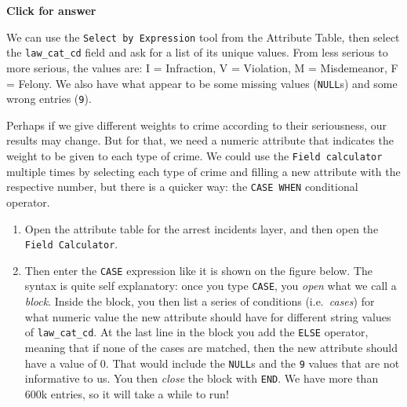 \documentclass[
  letterpaper,
  DIV=11,
  numbers=noendperiod]{scrreprt}
\begin{document}
\begin{tcolorbox}[enhanced jigsaw, toprule=.15mm, breakable, left=2mm, colframe=quarto-callout-important-color-frame, colback=white, arc=.35mm, leftrule=.75mm, opacityback=0, rightrule=.15mm, bottomrule=.15mm]

\vspace{-3mm}\textbf{Click for answer}\vspace{3mm}

We can use the \texttt{Select\ by\ Expression} tool from the Attribute
Table, then select the \texttt{law\_cat\_cd} field and ask for a list of
its unique values. From less serious to more serious, the values are: I
= Infraction, V = Violation, M = Misdemeanor, F = Felony. We also have
what appear to be some missing values (\texttt{NULL}s) and some wrong
entries (\texttt{9}).

\end{tcolorbox}

Perhaps if we give different weights to crime according to their
seriousness, our results may change. But for that, we need a numeric
attribute that indicates the weight to be given to each type of crime.
We could use the \texttt{Field\ calculator} multiple times by selecting
each type of crime and filling a new attribute with the respective
number, but there is a quicker way: the \texttt{CASE\ WHEN} conditional
operator.

\begin{enumerate}
\def\labelenumi{(\arabic{enumi})}
\setcounter{enumi}{338}
\item
  Open the attribute table for the arrest incidents layer, and then open
  the \texttt{Field\ Calculator}.
\item
  Then enter the \texttt{CASE} expression like it is shown on the figure
  below. The syntax is quite self explanatory: once you type
  \texttt{CASE}, you \emph{open} what we call a \emph{block}. Inside the
  block, you then list a series of conditions (i.e.~\emph{cases}) for
  what numeric value the new attribute should have for different string
  values of \texttt{law\_cat\_cd}. At the last line in the block you add
  the \texttt{ELSE} operator, meaning that if none of the cases are
  matched, then the new attribute should have a value of 0. That would
  include the \texttt{NULL}s and the \texttt{9} values that are not
  informative to us. You then \emph{close} the block with \texttt{END}.
  We have more than 600k entries, so it will take a while to run!
\end{enumerate}
\end{document}
